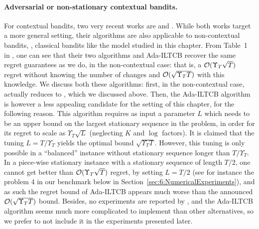 \paragraph{Adversarial or non-stationary contextual bandits.}
%
For contextual bandits, two very recent works are \cite{Luo18} and \cite{ChenLeeLuoWei2019}.
While both works target a more general setting, their algorithms are also applicable to non-contextual bandits, \ie, classical bandits like the model studied in this chapter.
From Table~1 in \cite{Luo18}, one can see that their two algorithms \ExpFourS{} and Ada-ILTCB recover the same regret guarantees as we do, in the non-contextual case:
that is, a $\mathcal{O}(\Upsilon_T \sqrt{T})$ regret without knowing the number of changes and $\mathcal{O}(\sqrt{\Upsilon_T T})$ with this knowledge.
We discuss both these algorithms:
%
first, in the non-contextual case, \ExpFourS{} actually reduces to \ExpThreeS, which we discussed above.
%
Then, the Ada-ILTCB algorithm is however a less appealing candidate for the setting of this chapter, for the following reason.
This algorithm requires as input a parameter $L$ which needs to be an upper bound on the largest stationary sequence in the problem, in order for its regret to scale as $\Upsilon_T \sqrt{L}$ (neglecting $K$ and $\log$ factors).
It is claimed that the tuning $L=T/\Upsilon_T$ yields the optimal bound $\sqrt{\Upsilon_T T}$.
However, this tuning is only possible in a ``balanced'' instance without stationary sequence longer than $T/\Upsilon_T$.
In a piece-wise stationary instance with a stationary sequence of length $T/2$, one cannot get better than $\mathcal{O}(\Upsilon_T \sqrt{T})$ regret, by setting $L=T/2$ (see for instance the problem 4 in our benchmark below in Section~\ref{sec:6:NumericalExperiments}), and as such the regret bound of Ada-ILTCB appears much worse than the announced $\mathcal{O}(\sqrt{\Upsilon_T T})$ bound.
%
Besides, no experiments are reported by \cite{Luo18}, and the Ada-ILTCB algorithm seems much more complicated to implement than other alternatives,
so we prefer to not include it in the experiments presented later.




